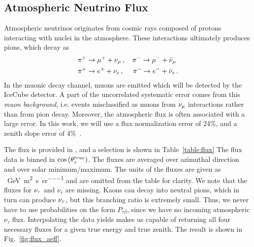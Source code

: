 \subsection{Atmospheric Neutrino Flux}
Atmospheric neutrinos originates from cosmic rays composed of protons interacting with nuclei in the atmosphere.
These interactions ultimately produces pions, which decay as 
\begin{align}\label{eq:pion}
    &\pi^+ \to \mu^+ + \nu_\mu\,, \quad \pi^- \to \mu^- + \bar{\nu}_\mu \nonumber \\
    &\pi^+ \to e^+ + \nu_e\,,\,\, \quad \pi^- \to e^- + \bar{\nu}_e\,.
\end{align}
In the muonic decay channel, muons are emitted which will be detected by the IceCube detector. A part of the 
uncorrelated systematic error comes from this \emph{muon background}, i.e. events misclassified as muons from 
$\nu_\mu$ interactions rather than from pion decay. Moreover, the atmospheric flux is often associated with a large error.
In this work, we will use a flux normalization error of 24\%, and a zenith slope error of 4\%~\cite{hondapaper}.

The flux is provided in \cite{hondaData,hondaArticle}, and a selection is shown in Table~\ref{table:flux}
The flux data is binned in $\cos{(\theta_z^{true})}$. The fluxes are averaged over azimuthal direction and over solar minimum/maximum. 
The units of the fluxes are given as \si{\per\GeV \per\metre\squared \per\second \per\steradian} and are omitted
from the table for clarity. 
We note that the fluxes for $\nu_\tau$ and $\nu_{\bar{\tau}}$ are missing. Kaons can decay into neutral pions, which in turn 
can produce $\nu_\tau$, but this branching ratio is extremely small. Thus, we never have to use probabilities on the form 
$P_{\tau \beta}$, since we have no incoming atmospheric $\nu_\tau$ flux. 
Interpolating the data yields makes us capable of returning all four necessary fluxes for a given true energy and true zenith.
The result is shown in Fig.~\ref{fig:flux_aeff}.

